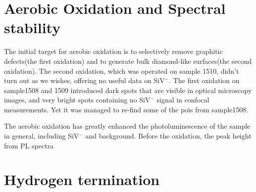 \section{Aerobic Oxidation and Spectral stability}
The initial target for aerobic oxidation is to selectively remove graphitic defects(the first oxidation) and to generate bulk diamond-like surfaces(the second oxidation). The second oxidation, which was operated on sample 1510, didn't turn out as we wishes, offering no useful data on SiV$^{-}$. The first oxidation on sample1508 and 1509 introduced dark spots that are visible in optical microscopy images, and very bright spots containing no SiV$^{-}$ signal in confocal measurements. Yet it was managed to re-find some of the pois from sample1508.

The aerobic oxidation has greatly enhanced the photoluminescence of the sample in general, including SiV$^{-}$ and background. Before the oxidation, the peak height from PL spectra 

\section{Hydrogen termination}


